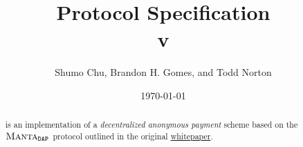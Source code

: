 \documentclass{article}
\title{\textbf{\MantaPay{} Protocol Specification}\\ v}
\author{Shumo Chu, Brandon H. Gomes, and Todd Norton}
\date{\today}
\begin{document}
    
\maketitle

\begin{abstract}
    \MantaPay{} is an implementation of a \emph{decentralized anonymous payment} scheme based on the ${{\textsc{Manta}}{}_{\texttt{DAP}}}$ protocol outlined in the original \href{https://eprint.iacr.org/2021/743.pdf}{\Manta{} whitepaper}.
\end{abstract}
    
\tableofcontents
\newpage












\end{document}
